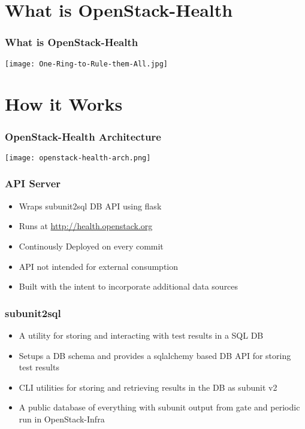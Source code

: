 \documentclass[aspectratio=169,11pt,hyperref={colorlinks=true}]{beamer}
\begin{document}
\section{What is OpenStack-Health}
\begin{frame}
    \frametitle{What is OpenStack-Health}
    \begin{center}
        \texttt{[image: One-Ring-to-Rule-them-All.jpg]}
    \end{center}
\end{frame}

\section{How it Works}
\begin{frame}
    \frametitle{OpenStack-Health Architecture}
    \begin{center}
        \texttt{[image: openstack-health-arch.png]}
    \end{center}
\end{frame}

\begin{frame}
    \frametitle{API Server}
    \begin{itemize}
        \item Wraps subunit2sql DB API using flask
        \item Runs at \href{http://health.openstack.org}{http://health.openstack.org}
        \item Continously Deployed on every commit
		\item API not intended for external consumption
        \item Built with the intent to incorporate additional data sources
    \end{itemize}
\end{frame}

\begin{frame}
    \frametitle{subunit2sql}
    \begin{itemize}
        \item A utility for storing and interacting with test results in a SQL DB
        \item Setups a DB schema and provides a sqlalchemy based DB API for storing test results
        \item CLI utilities for storing and retrieving results in the DB as subunit v2
        \item A public database of everything with subunit output from gate and periodic run in OpenStack-Infra
    \end{itemize}
\end{frame}
\end{document}
